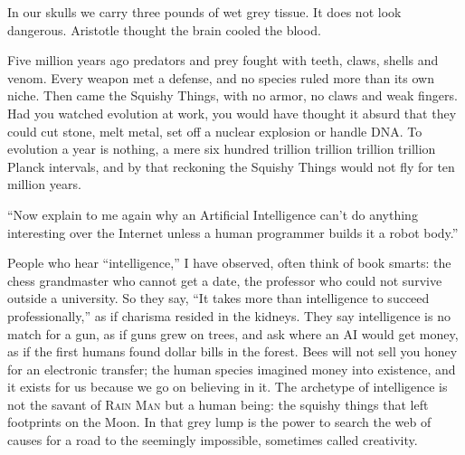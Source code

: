 
In our skulls we carry three pounds of wet grey tissue. It does not look dangerous. Aristotle thought the brain cooled the blood. 

Five million years ago predators and prey fought with teeth, claws, shells and venom. Every weapon met a defense, and no species ruled more than its own niche. Then came the Squishy Things, with no armor, no claws and weak fingers. Had you watched evolution at work, you would have thought it absurd that they could cut stone, melt metal, set off a nuclear explosion or handle DNA. To evolution a year is nothing, a mere six hundred trillion trillion trillion trillion Planck intervals, and by that reckoning the Squishy Things would not fly for ten million years.

``Now explain to me again why an Artificial Intelligence can't do anything interesting over the Internet unless a human programmer builds it a robot body.'' 

People who hear ``intelligence,'' I have observed, often think of book smarts: the chess grandmaster who cannot get a date, the professor who could not survive outside a university. So they say, ``It takes more than intelligence to succeed professionally,'' as if charisma resided in the kidneys.  They say intelligence is no match for a gun, as if guns grew on trees, and ask where an AI would get money, as if the first humans found dollar bills in the forest. Bees will not sell you honey for an electronic transfer; the human species imagined money into existence, and it exists for us because we go on believing in it.  The archetype of intelligence is not the savant of \textsc{Rain Man} but a human being: the squishy things that left footprints on the Moon. In that grey lump is the power to search the web of causes for a road to the seemingly impossible, sometimes called creativity.

